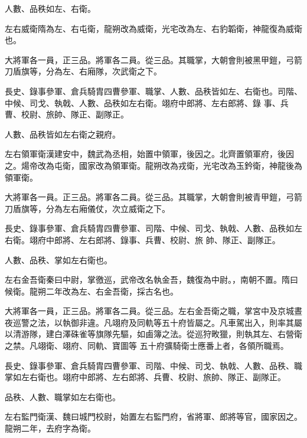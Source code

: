 \begin{pinyinscope}
 人數、品秩如左、右衛。



 左右威衛隋為左、右屯衛，龍朔改為威衛，光宅改為左、右豹韜衛，神龍復為威衛也。



 大將軍各一員，正三品。將軍各二員。從三品。其職掌，大朝會則被黑甲鎧，弓箭刀盾旗等，分為左、右廂隊，次武衛之下。



 長史、錄事參軍、倉兵騎胄四曹參軍、職掌、人數、品秩皆如左、右衛也。司階、中候、司戈、執戟、人數、品秩如左右衛。翊府中郎將、左右郎將、錄
 事、兵曹、校尉、旅帥、隊正、副隊正。



 人數、品秩皆如左右衛之親府。



 左右領軍衛漢建安中，魏武為丞相，始置中領軍，後因之。北齊置領軍府，後因之。煬帝改為屯衛，國家改為領軍衛。龍朔改為戎衛，光宅改為玉鈐衛，神龍後為領軍衛。



 大將軍各一員。正三品。將軍各二員。從三品。其職掌，大朝會則被青甲鎧，弓箭刀盾旗等，分為左右廂儀仗，次立威衛之下。



 長史、錄事參軍、倉兵騎胄四曹參軍、司階、中候、司戈、執戟、人數、品秩如左右衛。翊府中郎將、左右郎將、錄事、兵曹、校尉、旅
 帥、隊正、副隊正。



 人數、品秩、掌如左右衛也。



 左右金吾衛秦曰中尉，掌徼巡，武帝改名執金吾，魏復為中尉。，南朝不置。隋曰候衛。龍朔二年改為左、右金吾衛，採古名也。



 大將軍各一員，正三品。將軍各二員。從三品。左右金吾衛之職，掌宮中及京城晝夜巡警之法，以執御非違。凡翊府及同軌等五十府皆屬之。凡車駕出入，則率其屬以清游隊，建白澤硃雀等旗隊先驅，如鹵簿之法。從巡狩畋獵，則執其左、右營衛之禁。凡翊衛、翊府、同軌、寶圖等
 五十府彍騎衛士應番上者，各領所職焉。



 長史、錄事參軍、倉兵騎胄四曹參軍、司階、中候、司戈、執戟、人數、品秩、職掌如左右衛也。翊府中郎將、左右郎將、兵曹、校尉、旅帥、隊正、副隊正。



 品秩、人數、職掌如左右衛也。



 左右監門衛漢、魏曰城門校尉，始置左右監門府，省將軍、郎將等官，國家因之。龍朔二年，去府字為衛。




\end{pinyinscope}
